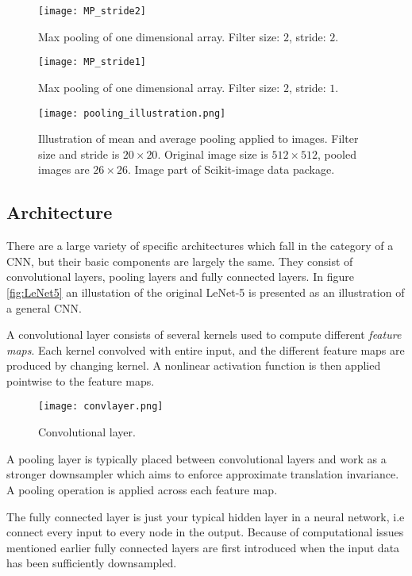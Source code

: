 \documentclass[../../thesis.tex]{subfiles}
\begin{document}
\begin{figure}[h]
    \label{fig:mp2}
    \texttt{[image: MP\_stride2]}
    \centering    
    \caption{Max pooling of one dimensional array. Filter size: $2$, stride: $2$.}
\end{figure}
\begin{figure}[h]
    \label{fig:mp1}
    \texttt{[image: MP\_stride1]}
    \centering    
    \caption{Max pooling of one dimensional array. Filter size: $2$, stride: $1$.}
\end{figure}

\begin{figure}[h]
    \label{fig:mean_max_pool}
    \centering
    \texttt{[image: pooling\_illustration.png]}
    \caption{Illustration of mean and average pooling applied to images. Filter size and stride is $20\times 20$. Original image size is $512\times 512$, pooled images are $26\times26$. Image part of Scikit-image data package.}
\end{figure}


\subsection{Architecture}
There are a large variety of specific architectures which fall in the category of a CNN, but their basic components are largely the same. They consist of convolutional layers, pooling layers and fully connected layers. In figure \ref{fig:LeNet5} an illustation of the original LeNet-5 \cite{LeCun1989ConvNet} is presented as an illustration of a general CNN.\newline

A convolutional layer consists of several kernels used to compute different \textit{feature maps}. Each kernel convolved with entire input, and the different feature maps are produced by changing kernel. A nonlinear activation function is then applied pointwise to the feature maps.
\begin{figure}[h]
    \centering
    \texttt{[image: convlayer.png]}
    \caption{Convolutional layer.}
\end{figure}
A pooling layer is typically placed between convolutional layers and work as a stronger downsampler which aims to enforce approximate translation invariance. A pooling operation is applied across each feature map.\newline

The fully connected layer is just your typical hidden layer in a neural network, i.e connect every input to every node in the output. Because of computational issues mentioned earlier fully connected layers are first introduced when the input data has been sufficiently downsampled.
\end{document}
